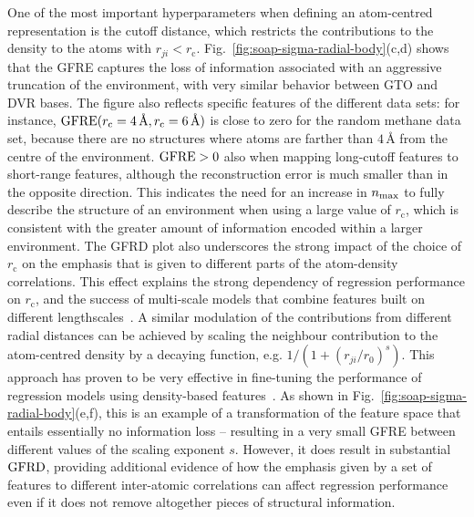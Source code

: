 One of the most important hyperparameters when defining an atom-centred representation is the cutoff distance, which restricts the contributions to the density to the atoms with $r_{ji}<r_{\text{c}}$.
Fig.~\ref{fig:soap-sigma-radial-body}(c,d) shows that the GFRE captures the loss of information associated with an aggressive truncation of the environment, with very similar behavior between GTO and DVR bases. 
The figure also reflects specific features of the different data sets: for instance, $\operatorname{GFRE}(r_\text{c}=4\,\text{\AA},r_\text{c}=6\,\text{\AA})$ is close to zero for the random methane data set, because there are no structures where atoms are farther than $4\,$\AA{} from the centre of the environment. $\operatorname{GFRE}>0$ also when mapping long-cutoff features to short-range features, although the reconstruction error is much smaller than in the opposite direction. 
This indicates the need for an increase in $n_\mathrm{max}$ to fully describe the structure of an environment when using a large value of $r_\text{c}$, which is consistent with the greater amount of information encoded within a larger environment.
The GFRD plot also underscores the strong impact of the choice of $r_\text{c}$ on the emphasis that is given to different parts of the atom-density correlations. 
This effect explains the strong dependency of regression performance on $r_\text{c}$, and the success of multi-scale models that combine features built on different lengthscales~\cite{bart+17sa}. 
A similar modulation of the contributions from different radial distances can be achieved by scaling the neighbour contribution to the atom-centred density by a decaying function, e.g. $1/(1+(r_{ji}/r_0)^s)$. This approach has proven to be very effective in fine-tuning the performance of regression models using density-based features~\cite{fabe+17jctc,will+18pccp,paru+18ncomm}.
As shown in Fig.~\ref{fig:soap-sigma-radial-body}(e,f), this is an example of a transformation of the feature space that entails essentially no information loss -- resulting in a very small GFRE between different values of the scaling exponent $s$. However, it does result in substantial $\operatorname{GFRD}$, providing additional evidence of how the emphasis given by a set of features to different inter-atomic correlations can affect regression performance even if it does not remove altogether pieces of structural information.


